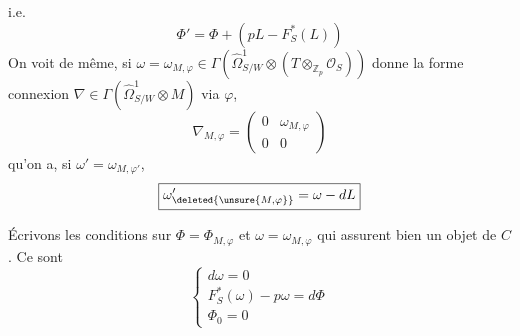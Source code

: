 i.e.
\[\boxed{\Phi'=\Phi+(pL-F_S^*(L))}\]
On voit de même, si $\omega=\omega_{M,\varphi}\in\Gamma(\widehat\Omega^1_{S/W}\otimes(T\otimes_{\mathbb Z_p}\mathcal O_S))$ donne la forme connexion $\nabla\in\Gamma(\widehat\Omega^1_{S/W}\otimes M)$ via $\varphi$,
\[
\nabla_{M,\varphi}=\begin{pmatrix}0&\omega_{M,\varphi}\\0&0\end{pmatrix}
\]
qu'on a, si $\omega'=\omega_{M,\varphi'}$, 
\[\boxed{\omega'_{\deleted{\unsure{M,\varphi}}}=\omega-dL}\]

Écrivons les conditions  sur  $\Phi=\Phi_{M,\varphi}$ et $\omega=\omega_{M,\varphi}$ qui assurent  bien un objet de $C$. Ce sont
\[
\left\{\begin{array}{l}
\boxed{d\omega=0}\\[1em]
\boxed{F_S^*(\omega)-p\omega=d\Phi}\\[1em]
\boxed{\Phi_0=0}
\end{array}\right.
\]
